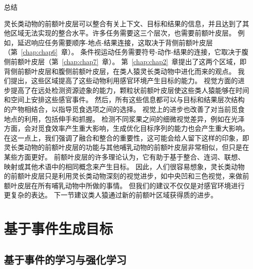 总结

灵长类动物的前额叶皮层可以整合有关上下文、目标和结果的信息，并且达到了其他区域无法实现的整合水平。许多任务需要这三个层次，也需要前额叶皮层。
例如，延迟响应任务需要顺序-地点-结果连接，这取决于背侧前额叶皮层（第~\ref{chap:chap6}~章）。
条件视运动任务需要符号-动作-结果的连接，它取决于腹侧前额叶皮层（第~\ref{chap:chap7}~章）。
第~\ref{chap:chap2}~章提出了这两个区域，即背侧前额叶皮层和腹侧前额叶皮层，在类人猿灵长类动物中进化而来的观点。
我们提出，这些区域提高了这些动物利用感官环境产生目标的能力。
视觉方面的进步提高了在远处检测资源迹象的能力，颗粒状前额叶皮层使这些类人猿能够在时间和空间上安排这些感官事件。
然后，所有这些信息都可以与目标和结果层次结构的产物相结合，以指导觅食选项之间的选择。
视觉上的进步也改善了对当前觅食地点的利用，包括伸手和抓握。
检测不同浆果之间的细微视觉差异，例如在光泽方面，会对觅食效率产生重大影响，生成优化目标序列的能力也会产生重大影响。
在这一点上，我们强调了融合和整合的重要性，这可能会给人留下这样的印象，即灵长类动物的前额叶皮层的功能与其他哺乳动物的前额叶皮层非常相似，但只是在某些方面更好。
前额叶皮层的许多理论认为，它有助于基于整合、连词、联想、映射或其他术语中的相同概念来产生目标。
因此，人们很容易想象，灵长类动物的前额叶皮层只是利用灵长类动物深刻的视觉进步，如中央凹和三色视觉，来做前额叶皮层在所有哺乳动物中所做的事情。
但我们的建议不仅仅是对感官环境进行更复杂的表达。
下一节建议类人猿通过新的前额叶区域获得质的进步。



\section{基于事件生成目标}

\subsection{基于事件的学习与强化学习}

